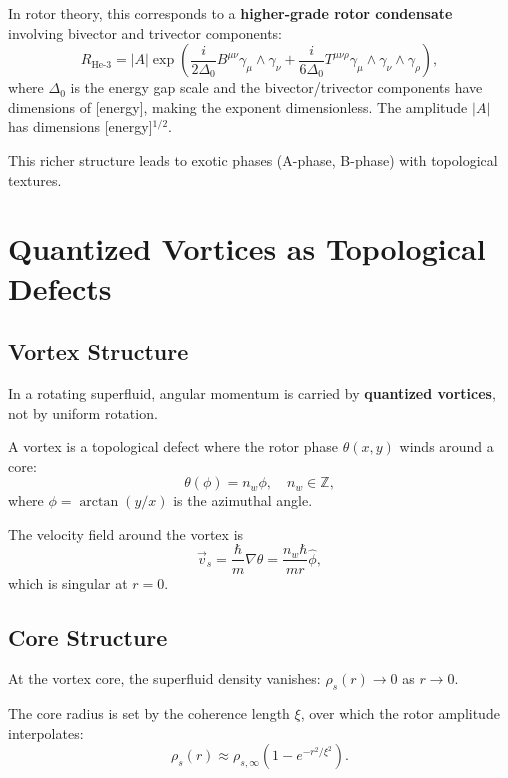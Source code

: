 \documentclass[12pt,a4paper]{article}
\theoremstyle{definition}
\theoremstyle{remark}
\begin{document}
In rotor theory, this corresponds to a \textbf{higher-grade rotor condensate} involving bivector and trivector components:
\begin{equation}
R_{\text{He-3}} = |A| \exp\left(\frac{i}{2\Delta_0} B^{\mu\nu} \gamma_\mu \wedge \gamma_\nu + \frac{i}{6\Delta_0} T^{\mu\nu\rho} \gamma_\mu \wedge \gamma_\nu \wedge \gamma_\rho\right),
\end{equation}
where $\Delta_0$ is the energy gap scale and the bivector/trivector components have dimensions of [energy], making the exponent dimensionless. The amplitude $|A|$ has dimensions [energy]$^{1/2}$.

This richer structure leads to exotic phases (A-phase, B-phase) with topological textures.

\section{Quantized Vortices as Topological Defects}

\subsection{Vortex Structure}

In a rotating superfluid, angular momentum is carried by \textbf{quantized vortices}, not by uniform rotation.

A vortex is a topological defect where the rotor phase $\theta(x,y)$ winds around a core:
\begin{equation}
\theta(\phi) = n_w \phi, \quad n_w \in \mathbb{Z},
\end{equation}
where $\phi = \arctan(y/x)$ is the azimuthal angle.

The velocity field around the vortex is
\begin{equation}
\vec{v}_s = \frac{\hbar}{m} \nabla \theta = \frac{n_w \hbar}{m r} \hat{\phi},
\end{equation}
which is singular at $r=0$.

\subsection{Core Structure}

At the vortex core, the superfluid density vanishes: $\rho_s(r) \to 0$ as $r \to 0$.

The core radius is set by the coherence length $\xi$, over which the rotor amplitude interpolates:
\begin{equation}
\rho_s(r) \approx \rho_{s,\infty} \left(1 - e^{-r^2/\xi^2}\right).
\end{equation}
\end{document}
